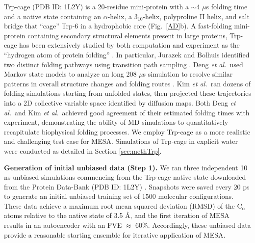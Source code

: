 \documentclass[12pt]{article}
\newcommand*{\blauw}[1]{#1}
\newcommand*{\groen}[1]{#1}
\begin{document}
Trp-cage (PDB ID: 1L2Y) is a 20-residue mini-protein \cite{neidigh2002designing} with a $\sim$4 $\mu$s folding time and a native state containing an $\alpha$-helix, a $3_{10}$-helix, polyproline II helix, and salt bridge that ``cage'' Trp-6 in a hydrophobic core \cite{kim2015systematic,qiu2002smaller,seshasayee2005high,heyda2011urea,juraszek2006sampling} (\blauw{Fig.~\ref{AD}b}). A fast-folding mini-protein containing secondary structural elements present in large proteins, Trp-cage has been extensively studied by both computation\cite{kim2015systematic,kim2016computational,juraszek2006sampling,hatch2014computational,kannan2014role,schug2005energy,snow2002trp,zhou2003trp,zhou2003free,deng2013kinetics,patriksson2007direct,pitera2003understanding} and experiment\cite{qiu2002smaller,meuzelaar2013folding,barua2008trp,iavarone2005conformational,rovo2013structural,adams2006probing} as the ``hydrogen atom of protein folding'' \cite{heyda2011urea,bolhuis2009two}. In particular, Jurazek and Bolhuis identified two distinct folding pathways using transition path sampling \cite{juraszek2006sampling}. Deng \textit{et al.}\ used Markov state models to analyze an long 208 $\mu$s simulation to resolve similar patterns in overall structure changes and folding routes \cite{deng2013kinetics}. Kim \textit{et al.}\ ran dozens of folding simulations starting from unfolded states, then projected these trajectories into a 2D collective variable space identified by diffusion maps\cite{kim2015systematic}.  Both Deng \textit{et al.}\ and Kim \textit{et al.}\ achieved good agreement of their estimated folding times with experiment, demonstrating the ability of MD simulations to quantitatively recapitulate biophysical folding processes. We employ Trp-cage as a more realistic and challenging test case for MESA. Simulations of Trp-cage in explicit water were conducted as detailed in \blauw{Section \ref{sec:methTrp}}.


\textbf{Generation of initial unbiased data (Step 1).}  We ran three independent 10 ns unbiased simulations commencing from the Trp-cage native state downloaded from the Protein Data-Bank (PDB ID: 1L2Y) \cite{neidigh2002designing,berman2002protein}. Snapshots were saved every 20 ps to generate an initial unbiased training set of 1500 molecular configurations. These data achieve a maximum root mean squared deviation (\groen{RMSD}) of the $\mathrm{C}_\alpha$ atoms relative to the native state of 3.5 \AA, and the first iteration of MESA results in an autoencoder with an FVE $\approx$ 60\%. Accordingly, these unbiased data provide a reasonable starting ensemble for iterative application of MESA.
\end{document}
